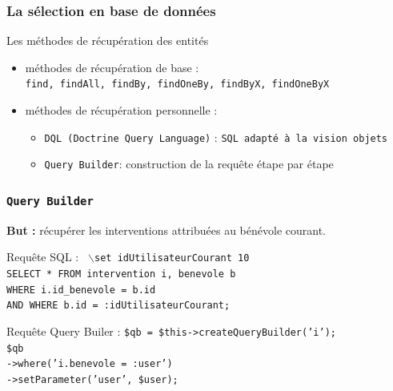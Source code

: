 \begin{frame}
\frametitle{La sélection en base de données}
	\begin{block}{Les méthodes de récupération des entités}
		\begin{itemize}
			\item méthodes de récupération de base : \\
			 \texttt{find, findAll, findBy, findOneBy, findByX, findOneByX}
			\item méthodes de récupération personnelle : \\
			\begin{itemize}
			\item \texttt{DQL (Doctrine Query Language)} : \texttt{SQL adapté à la vision objets}
			\item \texttt{Query Builder}: construction de la requête étape par étape
			\end{itemize}			
		\end{itemize}
	  \end{block}
\end{frame}

\begin{frame}
\frametitle{\texttt{Query Builder}}
	\textbf{But :} récupérer les interventions attribuées au bénévole courant. \\
	\vskip 0.5cm
	\begin{block}{Requête SQL :}	
	\texttt{ 
	\noindent $\backslash$set idUtilisateurCourant 10 \\ 	
	SELECT * FROM intervention i, benevole b \\
	\setlength{\parindent}{1cm}	WHERE i.id\_benevole = b.id\\
	\setlength{\parindent}{1cm}	AND WHERE b.id = :idUtilisateurCourant;}
	\end{block}
	\begin{block}{Requête Query Builer :}
	\noindent \texttt{\$qb = \$this->createQueryBuilder('i'); \\
	\noindent \$qb \\
	\setlength{\parindent}{1cm} ->where('i.benevole = :user') \\
    \setlength{\parindent}{1cm} ->setParameter('user', \$user);}
	\end{block}
\end{frame}

